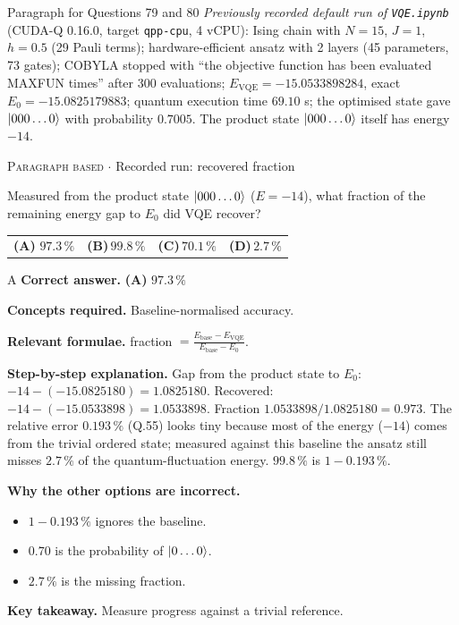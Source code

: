 \documentclass[11pt,a4paper]{article}
\newcommand{\optlabel}[1]{\textbf{(#1)}}
\newcommand{\correctlabel}[1]{\textcolor{okgreen}{\textbf{(#1)}\,\ding{51}}}
\newenvironment{qitem}[1]{\begin{list}{}{\setlength{\leftmargin}{3.3em}\setlength{\labelwidth}{3.1em}%
  \setlength{\labelsep}{0.2em}\setlength{\topsep}{3pt}\setlength{\parsep}{3pt}}\item[\textbf{Q.#1}\hfill]}{\end{list}}
\newcommand{\qsep}{\par\vspace{2pt}{\color{black!15}\hrule}\vspace{4pt}}
\newcommand{\qmeta}[2]{{\footnotesize\color{black!60}\textsc{#1} \;$\cdot$\; #2}\par}
\begin{document}
\begin{passagebox}{Paragraph for Questions 79 and 80}
\emph{Previously recorded default run of \texttt{VQE.ipynb}} (CUDA-Q 0.16.0, target \texttt{qpp-cpu}, 4 vCPU): Ising chain with $N = 15$, $J = 1$,
$h = 0.5$ (29 Pauli terms); hardware-efficient ansatz with 2 layers (45 parameters, 73 gates); COBYLA stopped with ``the objective function has
been evaluated MAXFUN times'' after 300 evaluations; $E_{\mathrm{VQE}} = -15.0533898284$, exact $E_0 = -15.0825179883$; quantum execution time
$69.10$ s; the optimised state gave $\ket{000\dots0}$ with probability $0.7005$. The product state $\ket{000\dots0}$ itself has energy $-14$.
\end{passagebox}
\begin{qitem}{79}
\qmeta{Paragraph based}{Recorded run: recovered fraction}
Measured from the product state $\ket{000\dots0}$ ($E = -14$), what fraction of the remaining energy gap to $E_0$ did VQE recover?
\par\smallskip\noindent\begin{tabularx}{\linewidth}{@{}*{4}{L}@{}}
\correctlabel{A}\,$97.3\,\%$ & \optlabel{B}\,$99.8\,\%$ & \optlabel{C}\,$70.1\,\%$ & \optlabel{D}\,$2.7\,\%$
\end{tabularx}
\end{qitem}
\begin{solbox}{A}
\textbf{\color{brand}Correct answer.} \textcolor{okgreen}{\textbf{(A)}} $97.3\,\%$

\textbf{\color{brand}Concepts required.} Baseline-normalised accuracy.

\textbf{\color{brand}Relevant formulae.} fraction $= \frac{E_{\mathrm{base}} - E_{\mathrm{VQE}}}{E_{\mathrm{base}} - E_0}$.

\textbf{\color{brand}Step-by-step explanation.} Gap from the product state to $E_0$: $-14 - (-15.0825180) = 1.0825180$. Recovered: $-14 - (-15.0533898) = 1.0533898$.
Fraction $1.0533898/1.0825180 = 0.973$. The relative error $0.193\,\%$ (Q.55) looks tiny because most of the energy ($-14$) comes from the trivial
ordered state; measured against this baseline the ansatz still misses $2.7\,\%$ of the quantum-fluctuation energy. $99.8\,\%$ is $1 - 0.193\,\%$.

\textbf{\color{brand}Why the other options are incorrect.}
\begin{itemize}[leftmargin=2.4em, itemsep=1pt, topsep=2pt]
\item[\textbf{(B)}] $1 - 0.193\,\%$ ignores the baseline.
\item[\textbf{(C)}] $0.70$ is the probability of $\ket{0\dots0}$.
\item[\textbf{(D)}] $2.7\,\%$ is the missing fraction.
\end{itemize}
\textbf{\color{brand}Key takeaway.} Measure progress against a trivial reference.
\end{solbox}
\qsep
\end{document}
